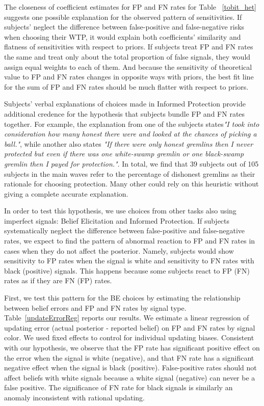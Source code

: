 \documentclass[12pt,a4paper]{article}
\begin{document}
The closeness of coefficient estimates for FP and FN rates for Table ~\ref{tobit_het} suggests one possible explanation for the observed pattern of sensitivities. If subjects' neglect the difference between false-positive and false-negative risks when choosing their WTP, it would explain both coefficients' similarity and flatness of sensitivities with respect to priors. If subjects treat FP and FN rates the same and treat only about the total proportion of false signals, they would assign equal weights to each of them. And because the sensitivity of theoretical value to FP and FN rates changes in opposite ways with priors, the best fit line for the sum of FP and FN rates should be much flatter with respect to priors.

Subjects' verbal explanations of choices made in Informed Protection provide additional credence for the hypothesis that subjects bundle FP and FN rates together. For example, the explanation from one of the subjects states\textit{"I took into consideration how many honest there were and looked at the chances of picking a ball."}, while another also states \textit{"If there were only honest gremlins then I never protected but even if there was one white-swamp gremlin or one black-swamp gremlin then I payed for protection."}. In total, we find that 39 subjects out of 105 subjects in the main waves refer to the percentage of dishonest gremlins as their rationale for choosing protection. Many other could rely on this heuristic without giving a complete accurate explanation.

In order to test this hypothesis, we use choices from other tasks also using imperfect signals: Belief Elicitation and Informed Protection. If subjects systematically neglect the difference between false-positive and false-negative rates, we expect to find the pattern of abnormal reaction to FP and FN rates in cases when they do not affect the posterior. Namely, subjects would show sensitivity to FP rates when the signal is white and sensitivity to FN rates with black (positive) signals. This happens because some subjects react to FP (FN) rates as if they are FN (FP) rates.

First, we test this pattern for the BE choices by estimating the relationship between belief errors and FP and FN rates by signal type. Table~\ref{updateErrorReg} reports our results. We estimate a linear regression of updating error (actual posterior - reported belief) on FP and FN rates by signal color. We used fixed effects to control for individual updating biases. Consistent with our hypothesis, we observe that the FP rate has significant positive effect on the error when the signal is white (negative), and that FN rate has a significant negative effect when the signal is black (positive). False-positive rates should not affect beliefs with white signals because a white signal (negative) can never be a false positive. The significance of FN rate for black signals is similarly an anomaly inconsistent with rational updating. 
\end{document}

